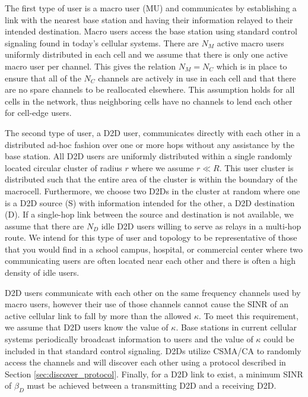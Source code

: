 \documentclass[10pt, final, journal, letterpaper,oneside, twocolumn]{IEEEtran}
\begin{document}
The first type of user is a macro user (MU) and communicates by establishing a link with the nearest base station and having their information relayed to their intended destination.  Macro users access the base station using standard control signaling found in today's cellular systems.  There are $N_M$ active macro users uniformly distributed in each cell and we assume that there is only one active macro user per channel.  This gives the relation $N_M = N_C$ which is in place to ensure that all of the $N_C$ channels are actively in use in each cell and that there are no spare channels to be reallocated elsewhere.  This assumption holds for all cells in the network, thus neighboring cells have no channels to lend each other for cell-edge users.  

The second type of user, a D2D user, communicates directly with each other in a distributed  ad-hoc fashion over one or more hops without any assistance by the base station.  All D2D users are uniformly distributed within a single randomly located circular cluster of radius $r$ where we assume $r \ll R$.  This user cluster is distributed such that the entire area of the cluster is within the boundary of the macrocell.  Furthermore, we choose two D2Ds in the cluster at random where one is a D2D source (S) with information intended for the other, a D2D destination (D).  If a single-hop link between the source and destination is not available, we assume that there are $N_D$ idle D2D users willing to serve as relays in a multi-hop route.  We intend for this type of user and topology to be representative of those that you would find in a school campus, hospital, or commercial center where two communicating users are often located near each other and there is often a high density of idle users. 

D2D users communicate with each other on the same frequency channels used by macro users, however their use of those channels cannot cause the SINR of an active cellular link to fall by more than the allowed $\kappa$.  To meet this requirement, we assume that D2D users know the value of $\kappa$.  Base stations in current cellular systems periodically broadcast information to users and the value of $\kappa$ could be included in that standard control signaling.  D2Ds utilize CSMA/CA to randomly access the channels and will discover each other using a protocol described in Section \ref{sec:discover_protocol}.  Finally, for a D2D link to exist, a minimum SINR of $\beta_{D}$ must be achieved between a transmitting D2D and a receiving D2D.  
\end{document}
